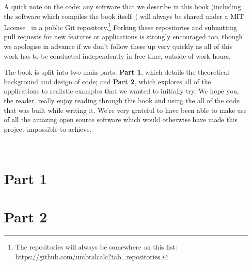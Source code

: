 \documentclass{book}
\begin{document}
A quick note on the code: any software that we describe in this book (including the software which compiles the book itself~\cite{diffusingideasbookgithub}) will always be shared under a MIT License~\cite{mitlicense} in a public Git repository.\footnote{The repositories will always be somewhere on this list: \href{https://github.com/umbralcalc?tab=repositories}{https://github.com/umbralcalc?tab=repositories}.} Forking these repositories and submitting pull requests for new features or applications is strongly encouraged too, though we apologise in advance if we don't follow these up very quickly as all of this work has to be conducted independently in free time, outside of work hours.

The book is split into two main parts: {\bfseries\sffamily Part 1}, which details the theoretical background and design of code; and {\bfseries\sffamily Part 2}, which explores all of the applications to realistic examples that we wanted to initially try. We hope you, the reader, really enjoy reading through this book and using the all of the code that was built while writing it. We're very grateful to have been able to make use of all the amazing open source software which would otherwise have made this project impossible to achieve.

\newpage \ \newpage
{\sffamily \tableofcontents}
\mainmatter

\part*{{\sffamily Part 1}}













\part*{{\sffamily Part 2}}




\end{document}
